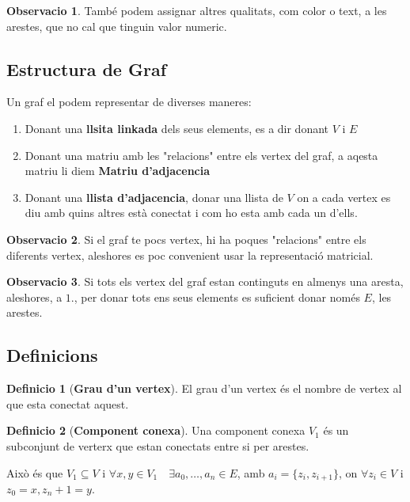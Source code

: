 \documentclass[12pt]{article}
\theoremstyle{definition}
\newtheorem{definicio}{Definicio}
\theoremstyle{definition}
\theoremstyle{definition}
\newtheorem{obs}{Observacio}
\theoremstyle{definition}
\theoremstyle{definition}
\theoremstyle{definition}
\theoremstyle{definition}
\begin{document}
\begin{obs}
També podem assignar altres qualitats, com color o text, a les arestes, que no cal que tinguin valor numeric.
\end{obs}

\subsection{Estructura de Graf}
Un graf el podem representar de diverses maneres:
\begin{enumerate}
	\item Donant una \textbf{llsita linkada} dels seus elements, es a dir donant $V$ i $E$
	\item Donant una matriu amb les "relacions" entre els vertex del graf, a aqesta matriu li diem \textbf{Matriu d'adjacencia}
	\item Donant una \textbf{llista d'adjacencia}, donar una llista de $V$ on a cada vertex es diu amb quins altres està conectat i com ho esta amb cada un d'ells.
\end{enumerate}

\begin{obs}
Si el graf te pocs vertex, hi ha poques "relacions" entre els diferents vertex, aleshores es poc convenient usar la representació matricial.
\end{obs}

\begin{obs}
Si tots els vertex del graf estan continguts en almenys una aresta, aleshores, a $1.$, per donar tots ens seus elements es suficient donar només $E$, les arestes.
\end{obs}

\subsection{Definicions}

\begin{definicio}[\textbf{Grau d'un vertex}]
El grau d'un vertex és el nombre de vertex al que esta conectat aquest.
\end{definicio}

\begin{definicio}[\textbf{Component conexa}]
Una component conexa $V_1$ és un subconjunt de verterx que estan conectats entre si per arestes.

Això és que $V_1\subseteq V$ i $\forall x,y\in V_1 \quad\exists a_0,\dots,a_n\in E$, amb $a_i=\{z_i,z_{i+1}\}$, on $\forall z_i\in V$ i $z_0=x,z_n+1=y$.
\end{definicio}
\end{document}
